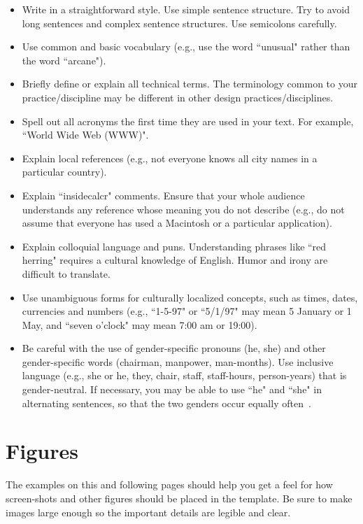\documentclass{chi-ext}
\begin{document}
\begin{itemize}\compresslist
\item   
Write in a straightforward style. 
Use simple sentence structure. 
Try to avoid long sentences and complex sentence structures. 
Use semicolons carefully.
\item   
Use common and basic vocabulary (e.g., use the word ``unusual" rather than the word ``arcane").
\item   
Briefly define or explain all technical terms. 
The terminology common to your practice/discipline may be different in other design practices/disciplines.
\item   
Spell out all acronyms the first time they are used in your text. 
For example, ``World Wide Web (WWW)".
\item   
Explain local references (e.g., not everyone knows all city names in a particular country).
\item   
Explain ``insidecalcr" comments. 
Ensure that your whole audience understands any reference whose meaning you do not describe (e.g., do not assume that everyone has used a Macintosh or a particular application).
\item   
Explain colloquial language and puns. 
Understanding phrases like ``red herring" requires a cultural knowledge of English. 
Humor and irony are difficult to translate.
\item   
Use unambiguous forms for culturally localized concepts, such as times, dates, currencies and numbers (e.g., ``1-5-97" or ``5/1/97" may mean 5 January or 1 May, and ``seven o'clock" may mean 7:00 am or 19:00).
\item   
Be careful with the use of gender-specific pronouns (he, she) and other gender-specific words (chairman, manpower, man-months). 
Use inclusive language (e.g., she or he, they, chair, staff, staff-hours, person-years) that is gender-neutral. 
If necessary, you may be able to use ``he" and ``she" in alternating sentences, so that the two genders occur equally often~\cite{Schwartz95}. 
\end{itemize}


\section{Figures}
The examples on this and following pages should help you get a feel for how screen-shots and other figures should be placed in the template. 
Be sure to make images large enough so the important details are legible and clear.
\end{document}
